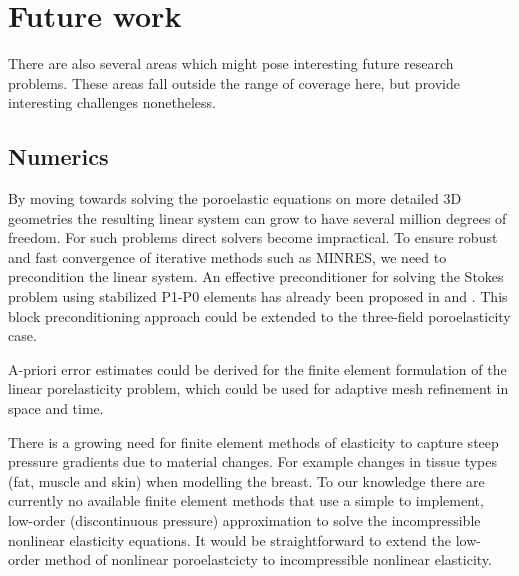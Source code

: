 \section{Future work}
There are also several areas which might pose interesting future research problems. These areas fall outside the range of coverage here, but provide interesting challenges nonetheless.

\subsection{Numerics}


By moving towards solving the poroelastic equations on more detailed 3D geometries the resulting linear system can grow to have several million degrees of freedom. For such problems direct solvers become impractical. To ensure robust and fast convergence of iterative methods such as MINRES, we need to precondition the linear system. An effective preconditioner for solving the Stokes problem using stabilized P1-P0 elements has already been proposed in \cite{wathen1993fast} and \cite{silvester1994fast}. This block preconditioning approach could be extended to the three-field poroelasticity case. 

A-priori error estimates could be derived for the finite element formulation of the linear porelasticity problem, which could be used for adaptive mesh refinement in space and time. 



There is a growing need for finite element methods of elasticity to capture steep pressure gradients due to material changes. For example changes in tissue types (fat, muscle and skin) when modelling the breast. To our knowledge there are currently no available finite element methods that use a simple to implement, low-order (discontinuous pressure) approximation to solve the incompressible nonlinear  elasticity equations. It would be straightforward to extend the low-order method of nonlinear poroelastcicty to incompressible nonlinear elasticity. 





